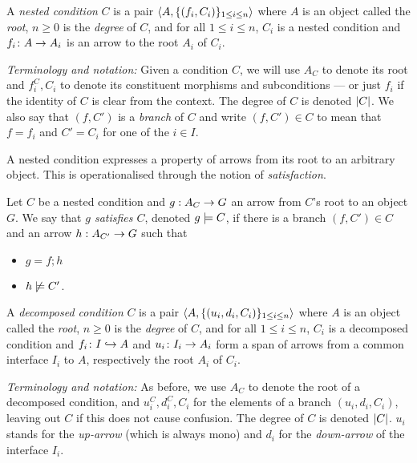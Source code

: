 \begin{definition}
  A \emph{nested condition} $C$ is a pair $\langle{A,\{{(f_i,C_i)}\}_{1\leq i\leq n}}\rangle$ where $A$ is an object called the \emph{root}, $n\geq 0$ is the \emph{degree} of $C$, and for all $1\leq i\leq n$, $C_i$ is a nested condition and $f_i\colon A\rightarrow A_i$ is an arrow to the root $A_i$ of $C_i$.
\end{definition}
%
\emph{Terminology and notation:} Given a condition $C$, we will use $A_C$ to denote its root and $f^C_i,C_i$ to denote its constituent morphisms and subconditions --- or just $f_i$ if the identity of $C$ is clear from the context. The degree of $C$ is denoted $|{C}|$. We also say that $(f,C')$ is a \emph{branch} of $C$ and write $(f,C')\in C$ to mean that $f=f_i$ and $C'=C_i$ for one of the $i\in I$.

\medskip\noindent A nested condition expresses a property of arrows from its root to an arbitrary object. This is operationalised through the notion of \emph{satisfaction}.

\begin{definition}
  Let $C$ be a nested condition and $g:A_C\rightarrow G$ an arrow from $C$'s root to an object $G$. We say that \emph{$g$ satisfies $C$}, denoted $g\models C$, if there is a branch $(f,C')\in C$ and an arrow $h:A_{C'}\rightarrow G$ such that
  \begin{itemize}
  \item $g=f;h$
  \item $h\not\models C'$.
  \end{itemize}
\end{definition}

\begin{definition}
  A \emph{decomposed condition} $C$ is a pair $\langle{A,\{{(u_i,d_i,C_i)}\}_{1\leq i\leq n}}\rangle$ where $A$ is an object called the \emph{root}, $n\geq 0$ is the \emph{degree} of $C$, and for all $1\leq i\leq n$, $C_i$ is a decomposed condition and $f_i\colon I\hookrightarrow A$ and $u_i\colon I_i\rightarrow A_i$ form a span of arrows from a common interface $I_i$ to $A$, respectively the root $A_i$ of $C_i$.
\end{definition}
%
\emph{Terminology and notation:} As before, we use $A_C$ to denote the root of a decomposed condition, and $u^C_i,d^C_i,C_i$ for the elements of a branch $(u_i,d_i,C_i)$, leaving out $C$ if this does not cause confusion. The degree of $C$ is denoted $|{C}|$. $u_i$ stands for the \emph{up-arrow} (which is always mono) and $d_i$ for the \emph{down-arrow} of the interface $I_i$.

